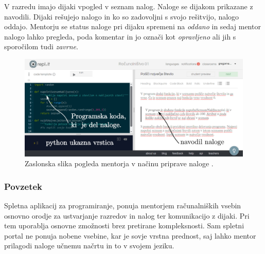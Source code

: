 V razredu imajo dijaki vpogled v seznam nalog. Naloge se dijakom
prikazane z navodili. Dijaki rešujejo nalogo in ko so zadovoljni s
svojo rešitvijo, nalogo oddajo. Mentorju se status naloge pri dijaku
spremeni na \emph{oddano} in sedaj mentor nalogo lahko pregleda, poda
komentar in jo označi kot \emph{opravljeno} ali jih s sporočilom tudi
\emph{zavrne}.

\begin{figure}[h!]
  \centering
    \includegraphics [width=0.65\linewidth, keepaspectratio =
   1] {./images/sc_web/replIT_assigment-v01.jpg}
   \caption{Zaslonska slika pogleda mentorja v načinu priprave naloge
     \cite{web:replIT}.}
    \label{fig:web:replIT:assigment}
\end{figure}

\subsubsection{Povzetek}
\label{sec:povzetek:replIT}

Spletna aplikacij za programiranje, ponuja mentorjem računalniških
vsebin osnovno orodje za ustvarjanje razredov in nalog ter
komunikacijo z dijaki. Pri tem uporablja osnovne zmožnosti brez
pretirane kompleksnosti. Sam spletni portal ne ponuja nobene vsebine,
kar je sovje vrstna prednost, saj lahko mentor prilagodi naloge učnemu
načrtu in to v svojem jeziku.

